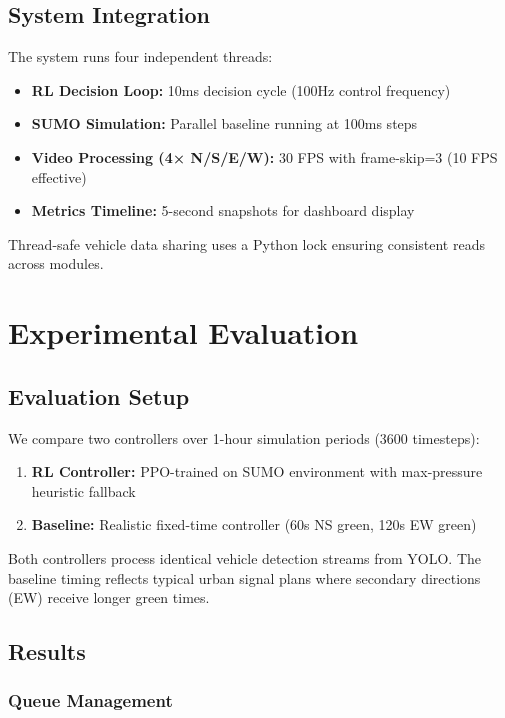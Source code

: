 \documentclass[10pt,conference]{IEEEtran}
\begin{document}
\subsection{System Integration}

The system runs four independent threads:

\begin{itemize}
    \item \textbf{RL Decision Loop:} 10ms decision cycle (100Hz control frequency)
    \item \textbf{SUMO Simulation:} Parallel baseline running at 100ms steps
    \item \textbf{Video Processing (4× N/S/E/W):} 30 FPS with frame-skip=3 (10 FPS effective)
    \item \textbf{Metrics Timeline:} 5-second snapshots for dashboard display
\end{itemize}

Thread-safe vehicle data sharing uses a Python lock ensuring consistent reads across modules.

\section{Experimental Evaluation}

\subsection{Evaluation Setup}

We compare two controllers over 1-hour simulation periods (3600 timesteps):

\begin{enumerate}
    \item \textbf{RL Controller:} PPO-trained on SUMO environment with max-pressure heuristic fallback
    \item \textbf{Baseline:} Realistic fixed-time controller (60s NS green, 120s EW green)
\end{enumerate}

Both controllers process identical vehicle detection streams from YOLO. The baseline timing reflects typical urban signal plans where secondary directions (EW) receive longer green times.

\subsection{Results}

\subsubsection{Queue Management}
\end{document}
